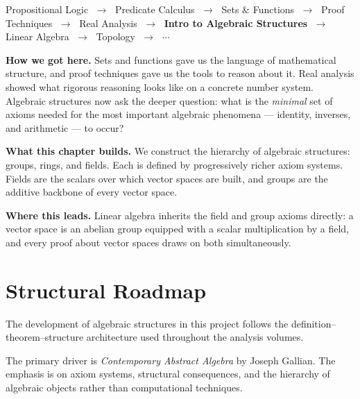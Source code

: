 \begin{tcolorbox}[
  colback=gray!6,
  colframe=gray!40,
  arc=2pt,
  left=8pt, right=8pt, top=6pt, bottom=6pt,
  title={\small\textbf{Where You Are in the Journey}},
  fonttitle=\small\bfseries
]
\begin{center}
\small
Propositional Logic
$\;\to\;$ Predicate Calculus
$\;\to\;$ Sets \& Functions
$\;\to\;$ Proof Techniques
$\;\to\;$ Real Analysis
$\;\to\;$ \textbf{Intro to Algebraic Structures}
$\;\to\;$ Linear Algebra
$\;\to\;$ Topology
$\;\to\;$ $\cdots$
\end{center}

\medskip
\noindent\textbf{How we got here.}
Sets and functions gave us the language of mathematical structure,
and proof techniques gave us the tools to reason about it.
Real analysis showed what rigorous reasoning looks like on a concrete
number system. Algebraic structures now ask the deeper question:
what is the \emph{minimal} set of axioms needed for the most important
algebraic phenomena --- identity, inverses, and arithmetic --- to occur?

\medskip
\noindent\textbf{What this chapter builds.}
We construct the hierarchy of algebraic structures: groups, rings,
and fields. Each is defined by progressively richer axiom systems.
Fields are the scalars over which vector spaces are built,
and groups are the additive backbone of every vector space.

\medskip
\noindent\textbf{Where this leads.}
Linear algebra inherits the field and group axioms directly:
a vector space is an abelian group equipped with a scalar multiplication
by a field, and every proof about vector spaces draws on both simultaneously.
\end{tcolorbox}
\vspace{1em}

\section*{Structural Roadmap}

The development of algebraic structures in this project follows
the definition--theorem--structure architecture used
throughout the analysis volumes.

The primary driver is \textit{Contemporary Abstract Algebra}
by Joseph Gallian. The emphasis is on axiom systems,
structural consequences, and the hierarchy of algebraic objects
rather than computational techniques.

